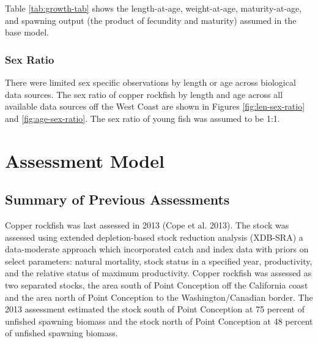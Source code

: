\documentclass[11pt,
  english,
  a4paper,
]{article}
\begin{document}

Table \ref{tab:growth-tab} shows the length-at-age, weight-at-age, maturity-at-age, and spawning output (the product of fecundity and maturity) assumed in the base model.

\leavevmode\tagmcend\tagstructend\par


\hypertarget{sex-ratio}{%
\subsubsection{Sex Ratio}\label{sex-ratio}}

\leavevmode\tagmcend\tagstructend


There were limited sex specific observations by length or age across biological data sources. The sex ratio of copper rockfish by length and age across all available data sources off the West Coast are shown in Figures \ref{fig:len-sex-ratio} and \ref{fig:age-sex-ratio}. The sex ratio of young fish was assumed to be 1:1.

\leavevmode\tagmcend\tagstructend\par


\hypertarget{assessment-model}{%
\section{Assessment Model}\label{assessment-model}}

\leavevmode\tagmcend\tagstructend


\hypertarget{summary-of-previous-assessments}{%
\subsection{Summary of Previous Assessments}\label{summary-of-previous-assessments}}

\leavevmode\tagmcend\tagstructend


Copper rockfish was last assessed in 2013 {(Cope et al. 2013)\leavevmode\tagmcend\tagstructend}. The stock was assessed using extended depletion-based stock reduction analysis (XDB-SRA) a data-moderate approach which incorporated catch and index data with priors on select parameters: natural mortality, stock status in a specified year, productivity, and the relative status of maximum productivity. Copper rockfish was assessed as two separated stocks, the area south of Point Conception off the California coast and the area north of Point Conception to the Washington/Canadian border. The 2013 assessment estimated the stock south of Point Conception at 75 percent of unfished spawning biomass and the stock north of Point Conception at 48 percent of unfished spawning biomass.
\end{document}
